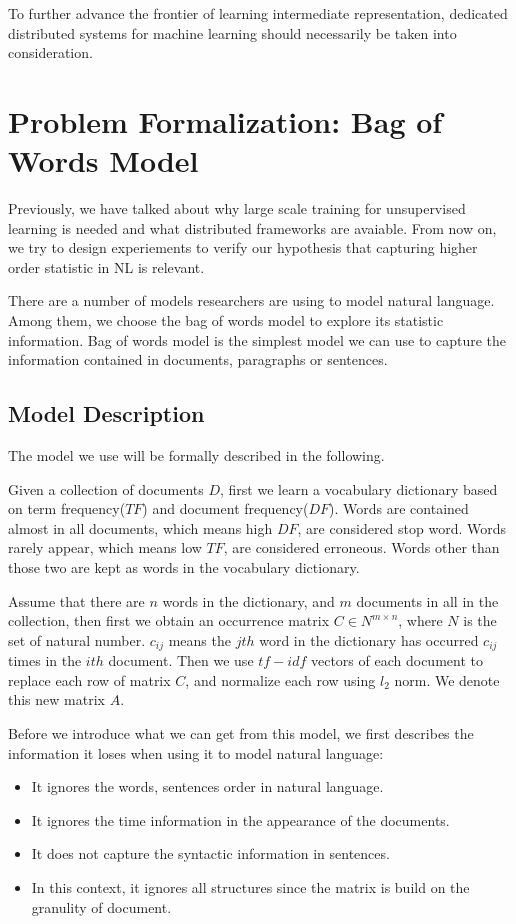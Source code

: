\documentclass[a4paper]{book}
\begin{document}
  To further advance the frontier of learning intermediate
  representation, dedicated distributed systems for machine learning
  should necessarily be taken into consideration.

  \section{Problem Formalization: Bag of Words Model}
  Previously, we have talked about why large scale training for
  unsupervised learning is needed and what distributed frameworks are
  avaiable. From now on, we try to design experiements to verify our
  hypothesis that capturing higher order statistic in NL is relevant.

  There are a number of models researchers are using to model natural
  language. Among them, we choose the bag of words model to explore its
  statistic information. Bag of words model is the simplest model we can
  use to capture the information contained in documents, paragraphs or
  sentences. 

  \subsection{Model Description}

  The model we use will be formally described in the following.

  Given a collection of documents $D$, first we learn a vocabulary
  dictionary based on term frequency($TF$) and document frequency($DF$).
  Words are contained almost in all documents, which means high $DF$, are
  considered stop word. Words rarely appear, which means low $TF$, are
  considered erroneous. Words other than those two are kept as words in
  the vocabulary dictionary.

  Assume that there are $n$ words in the dictionary, and $m$ documents
  in all in the collection, then first we obtain an occurrence matrix
  $C \in N^{m \times n}$, where $N$ is the set of natural number.
  $c_{ij}$ means the $jth$ word in the dictionary has occurred $c_{ij}$
  times in the $ith$ document. Then we use $tf-idf$ vectors of each
  document to replace each row of matrix $C$, and normalize each row
  using $l_{2}$ norm. We denote this new matrix $A$.

  Before we introduce what we can get from this model, we first
  describes the information it loses when using it to model natural
  language:

  \begin{itemize}
    \item It ignores the words, sentences order in natural language.
    \item It ignores the time information in the appearance of the
      documents.
    \item It does not capture the syntactic information in sentences.
    \item In this context, it ignores all structures since the matrix is
      build on the granulity of document.
  \end{itemize}
\end{document}
